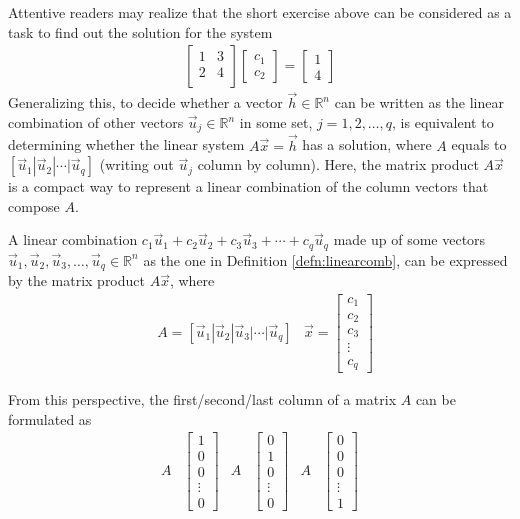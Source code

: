 Attentive readers may realize that the short exercise above can be considered as a task to find out the solution for the system
\begin{align*}
\begin{bmatrix}
1 & 3 \\
2 & 4 \\
\end{bmatrix}
\begin{bmatrix}
c_1 \\
c_2
\end{bmatrix} =
\begin{bmatrix}
1 \\
4
\end{bmatrix}
\end{align*}
Generalizing this, to decide whether a vector $\vec{h} \in \mathbb{R}^n$ can be written as the linear combination of other vectors $\vec{u}_j \in \mathbb{R}^n$ in some set, $j = 1, 2, \ldots, q$, is equivalent to determining whether the linear system $A\vec{x} = \vec{h}$ has a solution, where $A$ equals to $[\vec{u}_1|\vec{u}_2|\cdots|\vec{u}_q]$ (writing out $\vec{u}_j$ column by column). Here, the matrix product $A\vec{x}$ is a compact way to represent a linear combination of the column vectors that compose $A$.
\begin{proper}
\label{proper:linearcombmatrix}
A linear combination $c_1\vec{u}_1 + c_2\vec{u}_2 + c_3\vec{u}_3 + \cdots + c_q\vec{u}_q$ made up of some vectors $\vec{u}_1, \vec{u}_2, \vec{u}_3, \ldots, \vec{u}_q \in \mathbb{R}^n$ as the one in Definition \ref{defn:linearcomb}, can be expressed by the matrix product $A\vec{x}$, where
\begin{align*}
&A = [\vec{u}_1|\vec{u}_2|\vec{u}_3|\cdots|\vec{u}_q]
&\vec{x} =
\begin{bmatrix}
c_1 \\
c_2 \\
c_3 \\
\vdots \\
c_q
\end{bmatrix}
\end{align*}
\end{proper}
From this perspective, the first/second/last column of a matrix $A$ can be formulated as
\begin{align*}
A&
\begin{bmatrix}
1 \\
0 \\
0 \\
\vdots \\
0
\end{bmatrix}
&
A&
\begin{bmatrix}
0 \\
1 \\
0 \\
\vdots \\
0
\end{bmatrix}
&
A&
\begin{bmatrix}
0 \\
0 \\
0 \\
\vdots \\
1
\end{bmatrix}
\end{align*}
